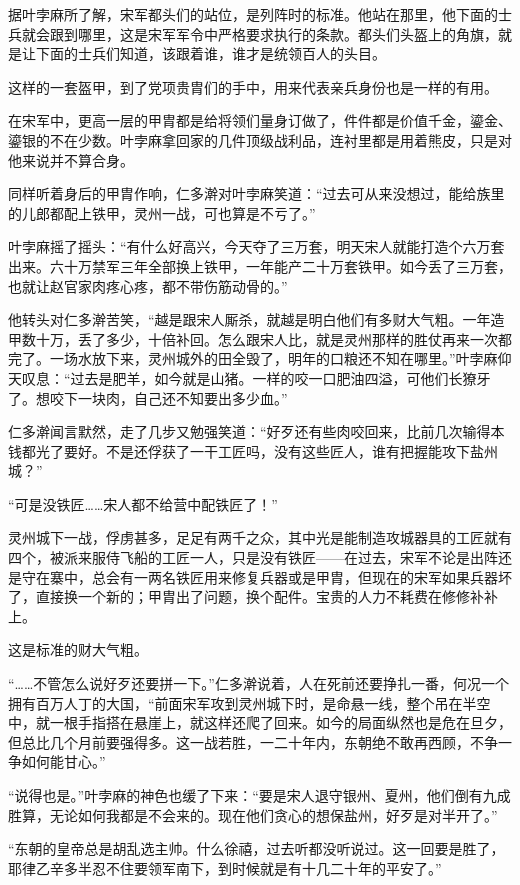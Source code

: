 据叶孛麻所了解，宋军都头们的站位，是列阵时的标准。他站在那里，他下面的士兵就会跟到哪里，这是宋军军令中严格要求执行的条款。都头们头盔上的角旗，就是让下面的士兵们知道，该跟着谁，谁才是统领百人的头目。

这样的一套盔甲，到了党项贵胄们的手中，用来代表亲兵身份也是一样的有用。

在宋军中，更高一层的甲胄都是给将领们量身订做了，件件都是价值千金，鎏金、鎏银的不在少数。叶孛麻拿回家的几件顶级战利品，连衬里都是用着熊皮，只是对他来说并不算合身。

同样听着身后的甲胄作响，仁多澣对叶孛麻笑道：“过去可从来没想过，能给族里的儿郎都配上铁甲，灵州一战，可也算是不亏了。”

叶孛麻摇了摇头：“有什么好高兴，今天夺了三万套，明天宋人就能打造个六万套出来。六十万禁军三年全部换上铁甲，一年能产二十万套铁甲。如今丢了三万套，也就让赵官家肉疼心疼，都不带伤筋动骨的。”

他转头对仁多澣苦笑，“越是跟宋人厮杀，就越是明白他们有多财大气粗。一年造甲数十万，丢了多少，十倍补回。怎么跟宋人比，就是灵州那样的胜仗再来一次都完了。一场水放下来，灵州城外的田全毁了，明年的口粮还不知在哪里。”叶孛麻仰天叹息：“过去是肥羊，如今就是山猪。一样的咬一口肥油四溢，可他们长獠牙了。想咬下一块肉，自己还不知要出多少血。”

仁多澣闻言默然，走了几步又勉强笑道：“好歹还有些肉咬回来，比前几次输得本钱都光了要好。不是还俘获了一干工匠吗，没有这些匠人，谁有把握能攻下盐州城？”

“可是没铁匠……宋人都不给营中配铁匠了！”

灵州城下一战，俘虏甚多，足足有两千之众，其中光是能制造攻城器具的工匠就有四个，被派来服侍飞船的工匠一人，只是没有铁匠——在过去，宋军不论是出阵还是守在寨中，总会有一两名铁匠用来修复兵器或是甲胄，但现在的宋军如果兵器坏了，直接换一个新的；甲胄出了问题，换个配件。宝贵的人力不耗费在修修补补上。

这是标准的财大气粗。

“……不管怎么说好歹还要拼一下。”仁多澣说着，人在死前还要挣扎一番，何况一个拥有百万人丁的大国，“前面宋军攻到灵州城下时，是命悬一线，整个吊在半空中，就一根手指搭在悬崖上，就这样还爬了回来。如今的局面纵然也是危在旦夕，但总比几个月前要强得多。这一战若胜，一二十年内，东朝绝不敢再西顾，不争一争如何能甘心。”

“说得也是。”叶孛麻的神色也缓了下来：“要是宋人退守银州、夏州，他们倒有九成胜算，无论如何我都是不会来的。现在他们贪心的想保盐州，好歹是对半开了。”

“东朝的皇帝总是胡乱选主帅。什么徐禧，过去听都没听说过。这一回要是胜了，耶律乙辛多半忍不住要领军南下，到时候就是有十几二十年的平安了。”

